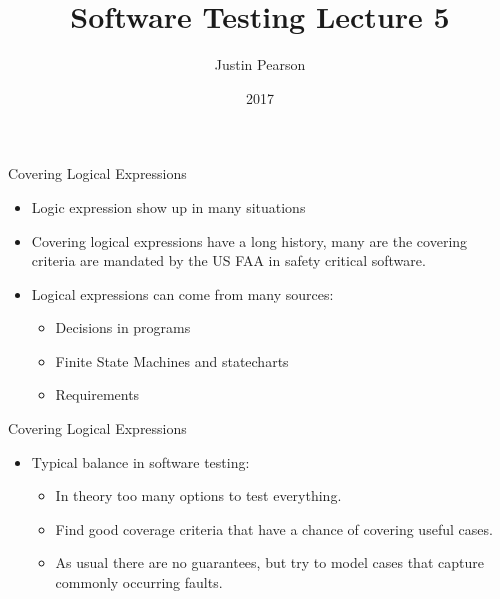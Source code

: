 \documentclass{beamer}
\title{Software Testing  Lecture 5}
\author{Justin Pearson}
\date{2017}
\begin{document}
\lstset{language=C}

\begin{frame}
  \maketitle
\end{frame}

\begin{frame}{Covering Logical Expressions}
  \begin{itemize}
  \item Logic expression show up in many situations
  \item Covering logical expressions have a long history, many are the
    covering criteria are mandated by the US FAA in safety critical
    software.
  \item Logical expressions can come from many sources:
    \begin{itemize}
    \item Decisions in programs
    \item Finite State Machines and statecharts 
    \item Requirements
    \end{itemize}
  \end{itemize}
  
\end{frame}
\begin{frame}{Covering Logical Expressions}
  \begin{itemize}
  \item Typical balance in software testing:
    \begin{itemize}
    \item In theory too many options to test everything.
    \item Find good coverage criteria that have a chance of covering
      useful cases.
    \item As usual there are no guarantees, but try to model cases that
      capture commonly occurring faults.
    \end{itemize}
  \end{itemize}  
\end{frame}
\end{document}
